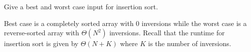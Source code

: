 \question Give a best and worst case input for insertion sort.

\begin{solution}[0.5in]
Best case is a completely sorted array with 0 inversions while the worst case
is a reverse-sorted array with $\Theta(N^2)$ inversions. Recall that the
runtime for insertion sort is given by $\Theta(N + K)$ where $K$ is the number
of inversions.
\end{solution}
